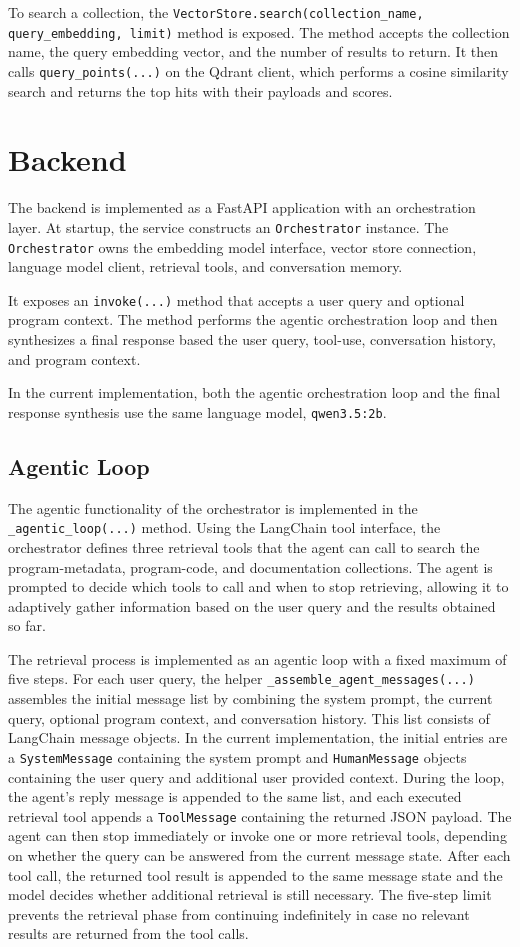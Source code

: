 To search a collection, the \texttt{VectorStore.search(collection\_name, query\_embedding, limit)} method is exposed. The method accepts the collection name, the query embedding vector, and the number of results to return. It then calls \texttt{query\_points(...)} on the Qdrant client, which performs a cosine similarity search and returns the top hits with their payloads and scores.


\section{Backend}
The backend is implemented as a FastAPI application with an orchestration layer. At startup, the service constructs an \texttt{Orchestrator} instance. The \texttt{Orchestrator} owns the embedding model interface, vector store connection, language model client, retrieval tools, and conversation memory.

It exposes an \texttt{invoke(...)} method that accepts a user query and optional program context. The method performs the agentic orchestration loop and then synthesizes a final response based the user query, tool-use, conversation history, and program context.

In the current implementation, both the agentic orchestration loop and the final response synthesis use the same language model, \texttt{qwen3.5:2b}.

\subsection{Agentic Loop}
The agentic functionality of the orchestrator is implemented in the \texttt{\_agentic\_loop(...)} method. Using the LangChain tool interface, the orchestrator defines three retrieval tools that the agent can call to search the program-metadata, program-code, and documentation collections. The agent is prompted to decide which tools to call and when to stop retrieving, allowing it to adaptively gather information based on the user query and the results obtained so far.

The retrieval process is implemented as an agentic loop with a fixed maximum of five steps. For each user query, the helper \texttt{\_assemble\_agent\_messages(...)} assembles the initial message list by combining the system prompt, the current query, optional program context, and conversation history. This list consists of LangChain message objects. In the current implementation, the initial entries are a \texttt{SystemMessage} containing the system prompt and \texttt{HumanMessage} objects containing the user query and additional user provided context. During the loop, the agent's reply message is appended to the same list, and each executed retrieval tool appends a \texttt{ToolMessage} containing the returned JSON payload. The agent can then stop immediately or invoke one or more retrieval tools, depending on whether the query can be answered from the current message state. After each tool call, the returned tool result is appended to the same message state and the model decides whether additional retrieval is still necessary. The five-step limit prevents the retrieval phase from continuing indefinitely in case no relevant results are returned from the tool calls.

